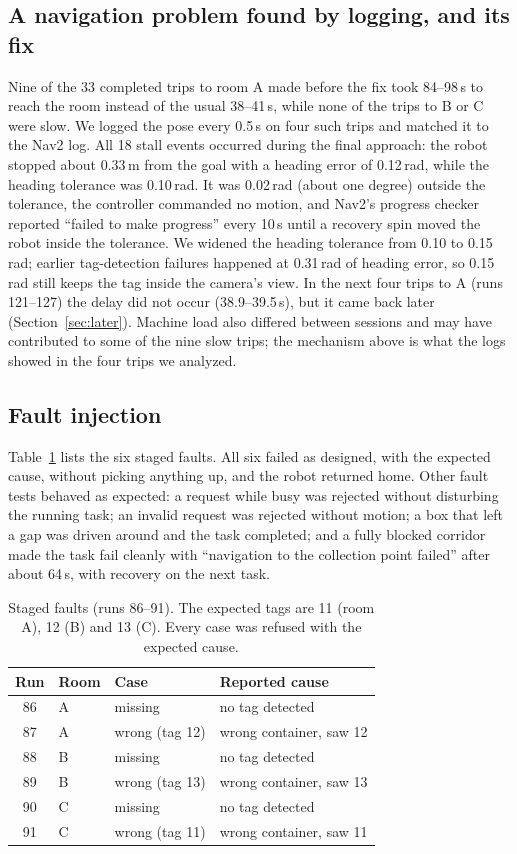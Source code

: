 \documentclass[conference]{IEEEtran}
\begin{document}
\subsection{A navigation problem found by logging, and its fix}
Nine of the 33 completed trips to room A made before the fix took 84--98\,s to reach the room instead of the usual 38--41\,s, while none of the trips to B or C were slow. We logged the pose every 0.5\,s on four such trips and matched it to the Nav2 log. All 18 stall events occurred during the final approach: the robot stopped about 0.33\,m from the goal with a heading error of 0.12\,rad, while the heading tolerance was 0.10\,rad. It was 0.02\,rad (about one degree) outside the tolerance, the controller commanded no motion, and Nav2's progress checker reported ``failed to make progress'' every 10\,s until a recovery spin moved the robot inside the tolerance. We widened the heading tolerance from 0.10 to 0.15\,rad; earlier tag-detection failures happened at 0.31\,rad of heading error, so 0.15\,rad still keeps the tag inside the camera's view. In the next four trips to A (runs 121--127) the delay did not occur (38.9--39.5\,s), but it came back later (Section~\ref{sec:later}). Machine load also differed between sessions and may have contributed to some of the nine slow trips; the mechanism above is what the logs showed in the four trips we analyzed.

\subsection{Fault injection}
Table~\ref{tab:faults} lists the six staged faults. All six failed as designed, with the expected cause, without picking anything up, and the robot returned home. Other fault tests behaved as expected: a request while busy was rejected without disturbing the running task; an invalid request was rejected without motion; a box that left a gap was driven around and the task completed; and a fully blocked corridor made the task fail cleanly with ``navigation to the collection point failed'' after about 64\,s, with recovery on the next task.

\begin{table}[t]
\caption{Staged faults (runs 86--91). The expected tags are 11 (room A), 12 (B) and 13 (C). Every case was refused with the expected cause.}
\label{tab:faults}
\centering
\small
\begin{tabular}{@{}clll@{}}
\toprule
Run & Room & Case & Reported cause \\
\midrule
86 & A & missing & no tag detected \\
87 & A & wrong (tag 12) & wrong container, saw 12 \\
88 & B & missing & no tag detected \\
89 & B & wrong (tag 13) & wrong container, saw 13 \\
90 & C & missing & no tag detected \\
91 & C & wrong (tag 11) & wrong container, saw 11 \\
\bottomrule
\end{tabular}
\end{table}
\end{document}
